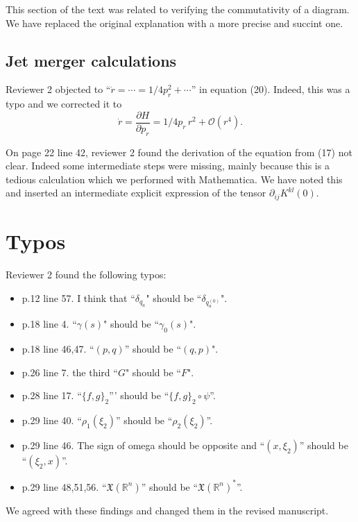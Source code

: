 \documentclass{article}
\begin{document}
This section of the text was related to verifying the commutativity of a diagram.  We have replaced the original explanation with a more precise and succint one.

\subsection{Jet merger calculations}
Reviewer 2 objected to ``$\dot{r} = \cdots = 1/4 p_r^2 + \cdots$'' in
equation (20). Indeed, this was a typo and we corrected it to
\begin{equation*}
  \dot{r} = \frac{\partial H}{\partial p_r} = 1/4 p_r\,r^2 + \mathcal{O}(r^4).
\end{equation*}

On page 22 line 42, reviewer 2 found the derivation of the equation
from (17) not clear. Indeed some intermediate steps were missing,
mainly because this is a tedious calculation which we performed with
Mathematica. We have noted this and inserted an intermediate explicit
expression of the tensor $\partial_{ij} K^{kl}(0)$.

\section{Typos}
Reviewer 2 found the following typos:
\begin{itemize}
 \item p.12 line 57. I think that ``$\delta_{q_a}$" should be ``$\delta_{q_a^{(0)}}$". 
\item p.18 line 4. ``$\gamma(s)$" should be ``$\gamma_0(s)$". 
\item p.18 line 46,47. ``$(p, q)$'' should be ``$(q, p)$". 
\item p.26 line 7. the third ``$G$" should be ``$F$".  
\item p.28 line 17. ``$\{f, g \}_2$''' should be ``$\{f, g \}_2 \circ \psi$''. 
\item p.29 line 40. ``$\rho_1(\xi_2)$'' should be ``$\rho_2(\xi_2)$''. 
\item p.29 line 46. The sign of omega should be opposite and ``$(x, \xi_2)$'' 
should be ``$(\xi_2, x)$''. 
\\
\item p.29 line 48,51,56. 
``$\mathfrak{X}(\mathbb{R}^n)$'' should be 
``$\mathfrak{X}(\mathbb{R}^n)^*$''. 
\end{itemize}

We agreed with these findings and changed them in the revised manuscript.
\end{document}
